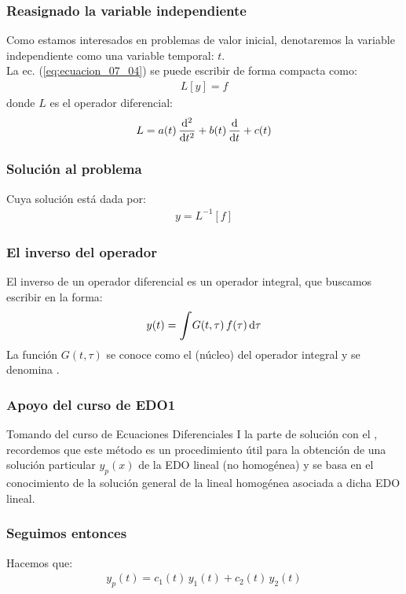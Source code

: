 \documentclass[12pt]{beamer}
\begin{document}
\begin{frame}
\frametitle{Reasignado la variable independiente}
Como estamos interesados en problemas de valor inicial, denotaremos la variable independiente como una variable temporal: $t$.
\\
\bigskip
\pause
La ec. (\ref{eq:ecuacion_07_04}) se puede escribir de forma compacta como:
\pause
\begin{align*}
L [y] = f
\end{align*}
\pause
donde $L$ es el operador diferencial:
\begin{align*}
L = a (t) \, \dv[2]{t} + b (t) \, \dv{t} + c (t) 
\end{align*}
\end{frame}

\begin{frame}
\frametitle{Solución al problema}
Cuya solución está dada por:
\pause
\begin{align*}
y = L^{-1} [f]
\end{align*}
\end{frame}

\begin{frame}
\frametitle{El inverso del operador}
El inverso de un operador diferencial es un operador integral, que buscamos escribir en la forma:
\pause
\begin{align*}
y (t) = \scaleint{6ex} G (t, \tau) \, f(\tau) \dd{\tau}
\end{align*}
\pause
La función $G (t, \tau)$ se conoce como el   (núcleo) del operador integral y  se denomina .
\end{frame}

\begin{frame}
\frametitle{Apoyo del curso de EDO1}
Tomando del curso de Ecuaciones Diferenciales I la parte de solución con el , \pause recordemos que este método es un procedimiento útil para la obtención de una solución particular $y_{p} (x)$ de la EDO lineal (no homogénea) y se basa en el conocimiento de la solución general de la lineal homogénea asociada a dicha EDO lineal.
\end{frame}

\begin{frame}
\frametitle{Seguimos entonces}
Hacemos que:
\pause
\begin{align}
y_{p} (t) = c_{1} (t) \, y_{1} (t) + c_{2} (t) \, y_{2} (t)
\label{eq:ecuacion_07_05}
\end{align}
\end{frame}
\end{document}
